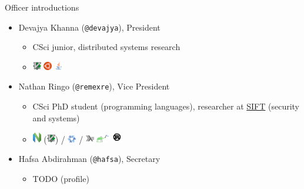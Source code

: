 \documentclass[aspectratio=169, notes]{beamer}
\begin{document}
\begin{frame}{Officer introductions}
	\begin{itemize}
	\item Devajya Khanna (\texttt{@devajya}), President
		\begin{itemize}
		\footnotesize
		\item CSci junior, distributed systems research
		\item
		\includegraphics[width=1em]{vim.png}
		\includegraphics[width=1em]{logo-ubuntu.png}
		\includegraphics[width=1em]{java.png}
		\end{itemize}
	\item Nathan Ringo (\texttt{@remexre}), Vice President
		\begin{itemize}
		\footnotesize
		\item CSci PhD student (programming languages), researcher at \href{https://sift.net/}{SIFT} (security and systems)
		\item
		\includegraphics[width=1em]{neovim.png} (\includegraphics[width=1em]{vim.png})
		/
		\includegraphics[width=1em]{nix.png}
		/
		\includegraphics[width=1em]{haskell.png}
		\includegraphics[width=1.5em]{lisp.png}
		\includegraphics[width=1.25em]{rust.png}
		\end{itemize}
	\item Hafsa Abdirahman (\texttt{@hafsa}), Secretary
		\begin{itemize}
		\footnotesize
		\item TODO (profile)

\end{itemize}
\end{itemize}
\end{frame}
\end{document}
